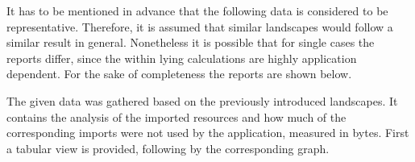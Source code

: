 It has to be mentioned in advance that the following data is considered to be representative. Therefore, it is assumed that similar landscapes would follow a similar result in general. Nonetheless it is possible that for single cases the reports differ, since the within lying calculations are highly application dependent.
For the sake of completeness the reports are shown below.

The given data was gathered based on the previously introduced landscapes. It contains the analysis of the imported resources and how much of the corresponding imports were not used by the application, measured in bytes. First a tabular view is provided, following by the corresponding graph.

\scriptsize 
\setlength{\mycolwidthtwo}{\dimexpr \textwidth/5 - 2\tabcolsep}%

